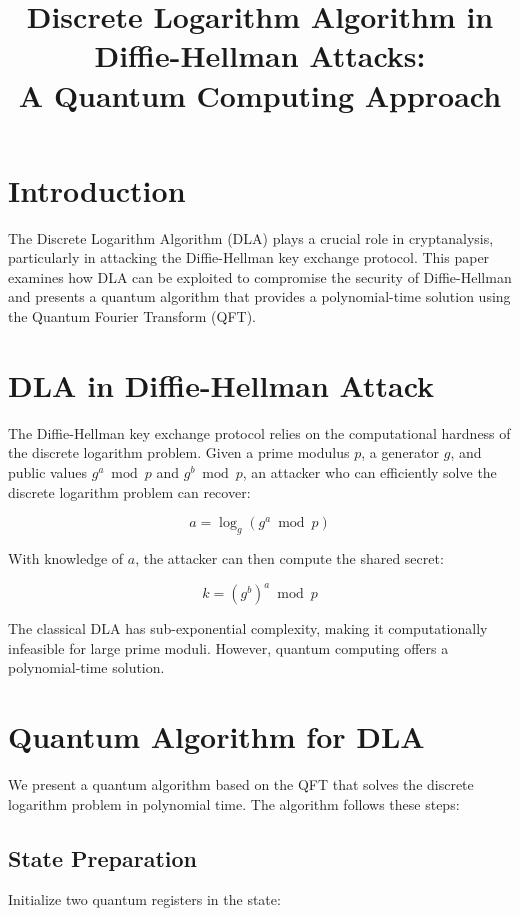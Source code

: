 \documentclass[12pt]{article}
\title{Discrete Logarithm Algorithm in Diffie-Hellman Attacks:\\
A Quantum Computing Approach}
\author{}
\date{}
\begin{document}
\maketitle

\section{Introduction}
The Discrete Logarithm Algorithm (DLA) plays a crucial role in cryptanalysis, particularly in attacking the Diffie-Hellman key exchange protocol. This paper examines how DLA can be exploited to compromise the security of Diffie-Hellman and presents a quantum algorithm that provides a polynomial-time solution using the Quantum Fourier Transform (QFT).

\section{DLA in Diffie-Hellman Attack}
The Diffie-Hellman key exchange protocol relies on the computational hardness of the discrete logarithm problem. Given a prime modulus $p$, a generator $g$, and public values $g^a \bmod p$ and $g^b \bmod p$, an attacker who can efficiently solve the discrete logarithm problem can recover:

\begin{equation}
    a = \log_g(g^a \bmod p)
\end{equation}

With knowledge of $a$, the attacker can then compute the shared secret:

\begin{equation}
    k = (g^b)^a \bmod p
\end{equation}

The classical DLA has sub-exponential complexity, making it computationally infeasible for large prime moduli. However, quantum computing offers a polynomial-time solution.

\section{Quantum Algorithm for DLA}
We present a quantum algorithm based on the QFT that solves the discrete logarithm problem in polynomial time. The algorithm follows these steps:

\subsection{State Preparation}
Initialize two quantum registers in the state:
\end{document}
